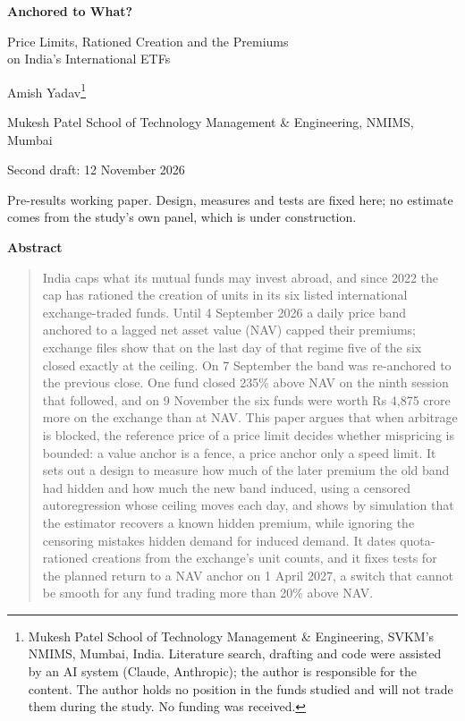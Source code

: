 \documentclass[11pt,a4paper]{article}
\theoremstyle{definition}
\begin{document}
\begin{titlepage}
\thispagestyle{empty}
\begin{center}
\vspace*{1.2cm}
{\LARGE\bfseries Anchored to What?\par}
\vspace{0.35cm}
{\Large Price Limits, Rationed Creation and the Premiums\\[0.15em] on India's International ETFs\par}
\vspace{1.0cm}
{\large Amish Yadav\footnote{Mukesh Patel School of Technology Management \& Engineering, SVKM's NMIMS, Mumbai, India. Literature search, drafting and code were assisted by an AI system (Claude, Anthropic); the author is responsible for the content. The author holds no position in the funds studied and will not trade them during the study. No funding was received.}\par}
\vspace{0.25cm}
{\normalsize Mukesh Patel School of Technology Management \& Engineering, NMIMS, Mumbai\par}
\vspace{0.5cm}
{\normalsize Second draft: 12 November 2026\par}
\vspace{0.15cm}
{\small Pre-results working paper. Design, measures and tests are fixed here; no estimate comes from the study's own panel, which is under construction.\par}
\end{center}
\vspace{0.8cm}
\begin{center}\textbf{Abstract}\end{center}
\vspace{-0.2cm}
\begin{quote}\small
India caps what its mutual funds may invest abroad, and since 2022 the cap has rationed the creation of units in its six listed international exchange-traded funds. Until 4 September 2026 a daily price band anchored to a lagged net asset value (NAV) capped their premiums; exchange files show that on the last day of that regime five of the six closed exactly at the ceiling. On 7 September the band was re-anchored to the previous close. One fund closed 235\% above NAV on the ninth session that followed, and on 9 November the six funds were worth Rs 4,875 crore more on the exchange than at NAV. This paper argues that when arbitrage is blocked, the reference price of a price limit decides whether mispricing is bounded: a value anchor is a fence, a price anchor only a speed limit. It sets out a design to measure how much of the later premium the old band had hidden and how much the new band induced, using a censored autoregression whose ceiling moves each day, and shows by simulation that the estimator recovers a known hidden premium, while ignoring the censoring mistakes hidden demand for induced demand. It dates quota-rationed creations from the exchange's unit counts, and it fixes tests for the planned return to a NAV anchor on 1 April 2027, a switch that cannot be smooth for any fund trading more than 20\% above NAV.

\end{quote}
\end{titlepage}
\end{document}
